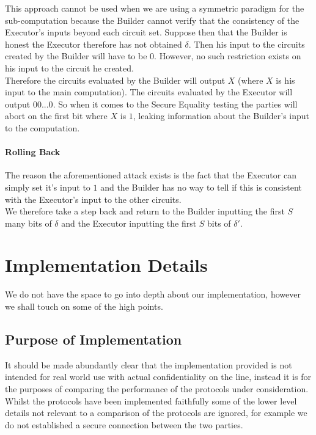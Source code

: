 \documentclass[ %
                    author={Nicholas Tutte},
                supervisor={Prof. Nigel Smart},
                    degree={MEng},
                     title={Secure Two Party Computation},
                  subtitle={A practical comparison of recent protocols},
                      type={Research - GG1K},
                      year={2015} ]{dissertation}
\begin{document}
					This approach cannot be used when we are using a symmetric paradigm for the sub-computation because the Builder cannot verify that the consistency of the Executor's inputs beyond each circuit set. Suppose then that the Builder is honest the Executor therefore has not obtained $\delta$. Then his input to the circuits created by the Builder will have to be $0$. However, no such restriction exists on his input to the circuit he created.\\

					Therefore the circuits evaluated by the Builder will output $X$ (where $X$ is his input to the main computation). The circuits evaluated by the Executor will output $00...0$. So when it comes to the Secure Equality testing the parties will abort on the first bit where $X$ is $1$, leaking information about the Builder's input to the computation.\\

				\subsubsection{Rolling Back}
					The reason the aforementioned attack exists is the fact that the Executor can simply set it's input to $1$ and the Builder has no way to tell if this is consistent with the Executor's input to the other circuits.\\

					We therefore take a step back and return to the Builder inputting the first $S$ many bits of $\delta$ and the Executor inputting the first $S$ bits of $\delta'$.


	\chapter{Implementation Details} \label{sec:ImplementationDetails}
		We do not have the space to go into depth about our implementation, however we shall touch on some of the high points.

		\section*{Purpose of Implementation}
			It should be made abundantly clear that the implementation provided is not intended for real world use with actual confidentiality on the line, instead it is for the purposes of comparing the performance of the protocols under consideration.\\

			Whilst the protocols have been implemented faithfully some of the lower level details not relevant to a comparison of the protocols are ignored, for example we do not established a secure connection between the two parties.\\
\end{document}
